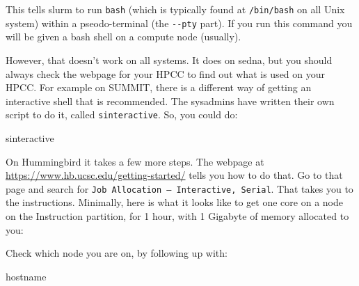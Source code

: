 \documentclass[]{krantz}
\makeatletter
\newenvironment{Shaded}{\begin{snugshade}}{\end{snugshade}}
\newcommand{\CommentTok}[1]{\textcolor[rgb]{0.37,0.37,0.37}{\textit{#1}}}
\newcommand{\ExtensionTok}[1]{#1}
\newcommand{\FunctionTok}[1]{\textcolor[rgb]{0,0,0}{#1}}
\newcommand{\NormalTok}[1]{#1}
\newcommand{\VariableTok}[1]{\textcolor[rgb]{0,0,0}{#1}}
\newenvironment{kframe}{%
\medskip{}
\setlength{\fboxsep}{.8em}
 \def\at@end@of@kframe{}%
 \ifinner\ifhmode%
  \def\at@end@of@kframe{\end{minipage}}%
  \begin{minipage}{\columnwidth}%
 \fi\fi%
 \def\FrameCommand##1{\hskip\@totalleftmargin \hskip-\fboxsep
 \colorbox{shadecolor}{##1}\hskip-\fboxsep
     \hskip-\linewidth \hskip-\@totalleftmargin \hskip\columnwidth}%
 \MakeFramed {\advance\hsize-\width
   \@totalleftmargin\z@ \linewidth\hsize
   \@setminipage}}%
 {\par\unskip\endMakeFramed%
 \at@end@of@kframe}
\renewenvironment{Shaded}{\begin{kframe}}{\end{kframe}}
\makeatother
\begin{document}
This tells slurm to run \texttt{bash} (which is typically found at \texttt{/bin/bash} on all Unix system) within
a pseodo-terminal (the \texttt{-\/-pty} part). If you run this command you will be given a bash shell on a compute
node (usually).

However, that doesn't work on all systems. It does on sedna, but you should always check the webpage for your
HPCC to find out what is used on your HPCC. For example on SUMMIT, there is
a different way of getting an interactive shell that is recommended. The
sysadmins have written their own script to do it, called \texttt{sinteractive}.
So, you could do:

\begin{Shaded}
\begin{Highlighting}[]
\ExtensionTok{sinteractive}
\end{Highlighting}
\end{Shaded}

On Hummingbird it takes a few more steps. The webpage at \url{https://www.hb.ucsc.edu/getting-started/}
tells you how to do that. Go to that page and search for \texttt{Job\ Allocation\ –\ Interactive,\ Serial}. That takes you to
the instructions. Minimally, here is what it looks like to get one core
on a node on the Instruction partition, for 1 hour, with 1 Gigabyte of memory
allocated to you:

\begin{Shaded}
\end{Shaded}

Check which node you are on, by following up with:

\begin{Shaded}
\begin{Highlighting}[]
\FunctionTok{hostname}
\end{Highlighting}
\end{Shaded}
\end{document}
